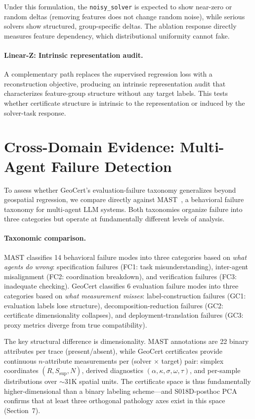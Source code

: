 \documentclass{article}
\begin{document}
Under this formulation, the \texttt{noisy\_solver} is expected to show near-zero or random deltas (removing features does not change random noise), while serious solvers show structured, group-specific deltas. The ablation response directly measures feature dependency, which distributional uniformity cannot fake.

\paragraph{Linear-Z: Intrinsic representation audit.} A complementary path replaces the supervised regression loss with a reconstruction objective, producing an intrinsic representation audit that characterizes feature-group structure without any target labels. This tests whether certificate structure is intrinsic to the representation or induced by the solver-task response.

\section{Cross-Domain Evidence: Multi-Agent Failure Detection}

To assess whether GeoCert's evaluation-failure taxonomy generalizes beyond geospatial regression, we compare directly against MAST~\cite{mast2025}, a behavioral failure taxonomy for multi-agent LLM systems. Both taxonomies organize failure into three categories but operate at fundamentally different levels of analysis.

\paragraph{Taxonomic comparison.} MAST classifies 14 behavioral failure modes into three categories based on \emph{what agents do wrong}: specification failures (FC1: task misunderstanding), inter-agent misalignment (FC2: coordination breakdown), and verification failures (FC3: inadequate checking). GeoCert classifies 6 evaluation failure modes into three categories based on \emph{what measurement misses}: label-construction failures (GC1: evaluation labels lose structure), decomposition-reduction failures (GC2: certificate dimensionality collapses), and deployment-translation failures (GC3: proxy metrics diverge from true compatibility).

The key structural difference is dimensionality. MAST annotations are 22 binary attributes per trace (present/absent), while GeoCert certificates provide continuous $n$-attribute measurements per (solver $\times$ target) pair: simplex coordinates $(R, S_{\text{sup}}, N)$, derived diagnostics $(\alpha, \kappa, \sigma, \omega, \tau)$, and per-sample distributions over $\sim$31K spatial units. The certificate space is thus fundamentally higher-dimensional than a binary labeling scheme---and S018D-posthoc PCA confirms that at least three orthogonal pathology axes exist in this space (Section~7).
\end{document}
